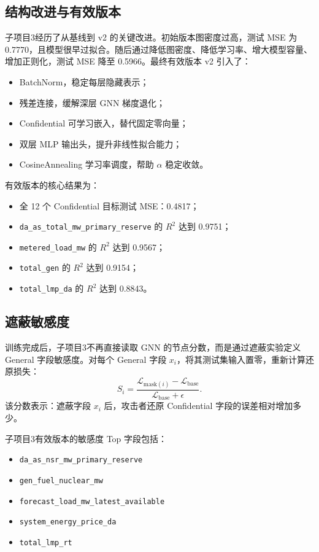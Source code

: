 \documentclass[UTF8,a4paper,11pt]{ctexart}
\begin{document}
\subsection{结构改进与有效版本}

子项目3经历了从基线到 v2 的关键改进。初始版本图密度过高，测试 MSE 为
0.7770，且模型很早过拟合。随后通过降低图密度、降低学习率、增大模型容量、
增加正则化，测试 MSE 降至 0.5966。最终有效版本 v2 引入了：
\begin{itemize}
  \item BatchNorm，稳定每层隐藏表示；
  \item 残差连接，缓解深层 GNN 梯度退化；
  \item Confidential 可学习嵌入，替代固定零向量；
  \item 双层 MLP 输出头，提升非线性拟合能力；
  \item CosineAnnealing 学习率调度，帮助 $\alpha$ 稳定收敛。
\end{itemize}

有效版本的核心结果为：
\begin{itemize}
  \item 全 12 个 Confidential 目标测试 MSE：0.4817；
  \item \texttt{da\_as\_total\_mw\_primary\_reserve} 的 $R^2$ 达到 0.9751；
  \item \texttt{metered\_load\_mw} 的 $R^2$ 达到 0.9567；
  \item \texttt{total\_gen} 的 $R^2$ 达到 0.9154；
  \item \texttt{total\_lmp\_da} 的 $R^2$ 达到 0.8843。
\end{itemize}

\subsection{遮蔽敏感度}

训练完成后，子项目3不再直接读取 GNN 的节点分数，而是通过遮蔽实验定义 General
字段敏感度。对每个 General 字段 $x_i$，将其测试集输入置零，重新计算还原损失：
\[
  S_i
  =
  \frac{
    \mathcal{L}_{\text{mask}(i)} - \mathcal{L}_{\text{base}}
  }{
    \mathcal{L}_{\text{base}} + \epsilon
  }.
\]
该分数表示：遮蔽字段 $x_i$ 后，攻击者还原 Confidential 字段的误差相对增加多少。

子项目3有效版本的敏感度 Top 字段包括：
\begin{itemize}
  \item \texttt{da\_as\_nsr\_mw\_primary\_reserve}
  \item \texttt{gen\_fuel\_nuclear\_mw}
  \item \texttt{forecast\_load\_mw\_latest\_available}
  \item \texttt{system\_energy\_price\_da}
  \item \texttt{total\_lmp\_rt}
\end{itemize}
\end{document}
